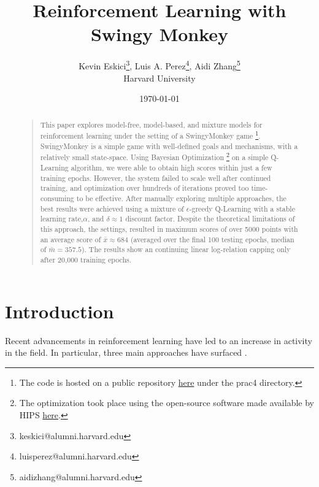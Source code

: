 \documentclass[letterpaper]{article}
\title{Reinforcement Learning with Swingy Monkey}
\author{Kevin Eskici\thanks{keskici@alumni.harvard.edu}, Luis A. Perez\thanks{luisperez@alumni.harvard.edu}, Aidi Zhang\thanks{aidizhang@alumni.harvard.edu} \\
Harvard University}
\date{\today}
\begin{document}
\maketitle

\begin{abstract}
\begin{quote}
This paper explores model-free, model-based, and mixture models for reinforcement learning under the setting of a SwingyMonkey game \footnote{The code is hosted on a public repository \href{https://github.com/kandluis/machine-learning}{here} under the prac4 directory.}. SwingyMonkey is a simple game with well-defined goals and mechanisms, with a relatively small state-space. Using Bayesian Optimization \footnote{The optimization took place using the open-source software made available by HIPS \href{https://github.com/HIPS/Spearmint}{here}.} on a simple Q-Learning algorithm, we were able to obtain high scores within just a few training epochs. However, the system failed to scale well after continued training, and optimization over hundreds of iterations proved too time-consuming to be effective. After manually exploring multiple approaches, the best results were achieved using a mixture of $\epsilon$-greedy Q-Learning with a stable learning rate,$\alpha$, and $\delta \approx 1$ discount factor. Despite the theoretical limitations of this approach, the settings, resulted in maximum scores of over 5000 points with an average score of $\bar{x} \approx 684$ (averaged over the final 100 testing epochs, median of $\bar{m} = 357.5$). The results show an continuing linear log-relation capping only after 20,000 training epochs.    
\end{quote}
\end{abstract}

\section{Introduction}
\label{sec:introduction}
Recent advancements in reinforcement learning have led to an increase in activity in the field. In particular, three main approaches have surfaced \cite{rl_lecture}. 
\end{document}
